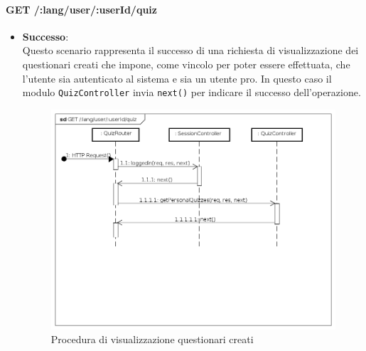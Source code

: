 \paragraph{GET /:lang/user/:userId/quiz} %
\begin{itemize}
\item \textbf{Successo}:\\
Questo scenario rappresenta il successo di una richiesta di visualizzazione dei questionari creati che impone, come vincolo per poter essere effettuata, che l'utente sia autenticato al sistema e sia un utente pro. In questo caso il modulo \texttt{QuizController} invia \texttt{next()} per indicare il successo dell'operazione.
\label{Procedura di visualizzazione questionari creati}
\begin{figure}[ht]
	\centering
	\includegraphics[scale=0.40]{UML/DiagrammiDiSequenza/Back-end/GET__lang_user_userId_quiz_success.png}
	\caption{Procedura di visualizzazione questionari creati}
\end{figure}
\FloatBarrier


\end{itemize}
